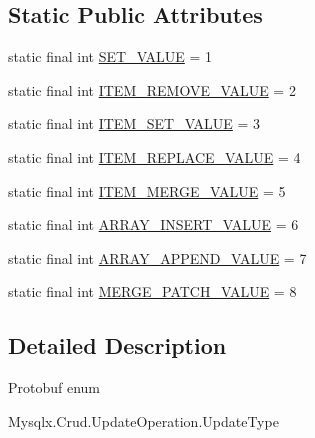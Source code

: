 \subsection*{Static Public Attributes}
\begin{DoxyCompactItemize}
\item 
static final int \mbox{\hyperlink{enumcom_1_1mysql_1_1cj_1_1x_1_1protobuf_1_1_mysqlx_crud_1_1_update_operation_1_1_update_type_a8f46778d8f35bf7ede964db702952197}{S\+E\+T\+\_\+\+V\+A\+L\+UE}} = 1
\item 
static final int \mbox{\hyperlink{enumcom_1_1mysql_1_1cj_1_1x_1_1protobuf_1_1_mysqlx_crud_1_1_update_operation_1_1_update_type_a81a4f937c3d6db4b8d5462f79d42aa67}{I\+T\+E\+M\+\_\+\+R\+E\+M\+O\+V\+E\+\_\+\+V\+A\+L\+UE}} = 2
\item 
static final int \mbox{\hyperlink{enumcom_1_1mysql_1_1cj_1_1x_1_1protobuf_1_1_mysqlx_crud_1_1_update_operation_1_1_update_type_af5810e4b8bc8c6397927f1bd6f70f954}{I\+T\+E\+M\+\_\+\+S\+E\+T\+\_\+\+V\+A\+L\+UE}} = 3
\item 
static final int \mbox{\hyperlink{enumcom_1_1mysql_1_1cj_1_1x_1_1protobuf_1_1_mysqlx_crud_1_1_update_operation_1_1_update_type_acc11a5a225cf28d9237c2edc08339f29}{I\+T\+E\+M\+\_\+\+R\+E\+P\+L\+A\+C\+E\+\_\+\+V\+A\+L\+UE}} = 4
\item 
static final int \mbox{\hyperlink{enumcom_1_1mysql_1_1cj_1_1x_1_1protobuf_1_1_mysqlx_crud_1_1_update_operation_1_1_update_type_a4ffea96d9346f93cd601cf81249b384c}{I\+T\+E\+M\+\_\+\+M\+E\+R\+G\+E\+\_\+\+V\+A\+L\+UE}} = 5
\item 
static final int \mbox{\hyperlink{enumcom_1_1mysql_1_1cj_1_1x_1_1protobuf_1_1_mysqlx_crud_1_1_update_operation_1_1_update_type_a184ae6dab2891d4cbd62608eca56a326}{A\+R\+R\+A\+Y\+\_\+\+I\+N\+S\+E\+R\+T\+\_\+\+V\+A\+L\+UE}} = 6
\item 
static final int \mbox{\hyperlink{enumcom_1_1mysql_1_1cj_1_1x_1_1protobuf_1_1_mysqlx_crud_1_1_update_operation_1_1_update_type_ac4b8af121e1c3b43754c5838d7a9c571}{A\+R\+R\+A\+Y\+\_\+\+A\+P\+P\+E\+N\+D\+\_\+\+V\+A\+L\+UE}} = 7
\item 
static final int \mbox{\hyperlink{enumcom_1_1mysql_1_1cj_1_1x_1_1protobuf_1_1_mysqlx_crud_1_1_update_operation_1_1_update_type_a3feb31318d8002777b728bbd63d8527a}{M\+E\+R\+G\+E\+\_\+\+P\+A\+T\+C\+H\+\_\+\+V\+A\+L\+UE}} = 8
\end{DoxyCompactItemize}


\subsection{Detailed Description}
Protobuf enum
\begin{DoxyCode}
Mysqlx.Crud.UpdateOperation.UpdateType 
\end{DoxyCode}
 

